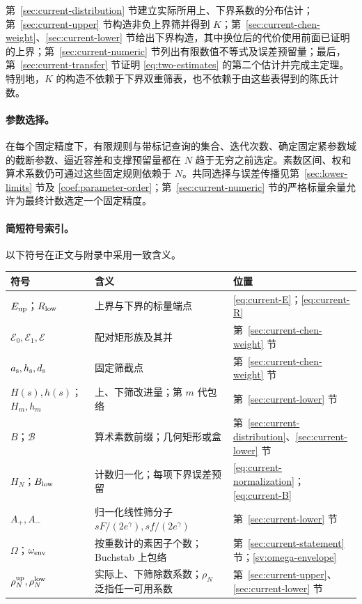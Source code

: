 第~\ref{sec:current-distribution} 节建立实际所用上、下界系数的分布估计；第~\ref{sec:current-upper} 节构造非负上界筛并得到 $K$；第~\ref{sec:current-chen-weight}、\ref{sec:current-lower} 节给出下界构造，其中换位后的代价使用前面已证明的上界；第~\ref{sec:current-numeric} 节列出有限数值不等式及误差预留量；最后，第~\ref{sec:current-transfer} 节证明 \eqref{eq:two-estimates} 的第二个估计并完成主定理。特别地，$K$ 的构造不依赖于下界双重筛表，也不依赖于由这些表得到的陈氏计数。

\paragraph{参数选择。}
在每个固定精度下，有限规则与带标记查询的集合、迭代次数、确定固定紧参数域的截断参数、逼近容差和支撑预留量都在 $N$ 趋于无穷之前选定。素数区间、权和算术系数仍可通过这些固定规则依赖于 $N$。共同选择与误差传播见第~\ref{sec:lower-limits} 节及 \eqref{coef:parameter-order}；第~\ref{sec:current-numeric} 节的严格标量余量允许为最终计数选定一个固定精度。

\paragraph{简短符号索引。}
以下符号在正文与附录中采用一致含义。
\begin{center}
\small
\begin{tabular}{@{}>{\raggedright\arraybackslash}p{}>{\raggedright\arraybackslash}p{}>{\raggedright\arraybackslash}p{}@{}}
\toprule 符号 & 含义 & 位置\\
\midrule
$E_{\rm up}$；$R_{\rm low}$ & 上界与下界的标量端点 & \eqref{eq:current-E}；\eqref{eq:current-R}\\[2pt]
$\mathscr E_0,\mathscr E_1,\mathscr E$ & 配对矩形族及其并 & 第~\ref{sec:current-chen-weight} 节\\[2pt]
$a_{\rm s},h_{\rm s},d_{\rm s}$ & 固定筛截点 & 第~\ref{sec:current-chen-weight} 节\\[2pt]
$H(s),h(s)$；$H_m,h_m$ & 上、下筛改进量；第 $m$ 代包络 & 第~\ref{sec:current-lower} 节\\[2pt]
$B$；$\mathscr B$ & 算术素数前缀；几何矩形或盒 & 第~\ref{sec:current-distribution}、\ref{sec:current-lower} 节\\[2pt]
$H_N$；$B_{\rm low}$ & 计数归一化；每项下界误差预留 & \eqref{eq:current-normalization}；\eqref{eq:current-B}\\[2pt]
$A_+,A_-$ & 归一化线性筛分子 $sF/(2e^\gamma),sf/(2e^\gamma)$ & 第~\ref{sec:current-lower} 节\\[2pt]
$\Omega$；$\omega_{\rm env}$ & 按重数计的素因子个数；Buchstab 上包络 & 第~\ref{sec:current-statement} 节；\eqref{sv:omega-envelope}\\[2pt]
$\rho_N^{\rm up},\rho_N^{\rm low}$ & 实际上、下筛除数系数；$\rho_N$ 泛指任一可用系数 & 第~\ref{sec:current-upper}、\ref{sec:current-lower} 节\\[2pt]
\bottomrule
\end{tabular}
\end{center}

